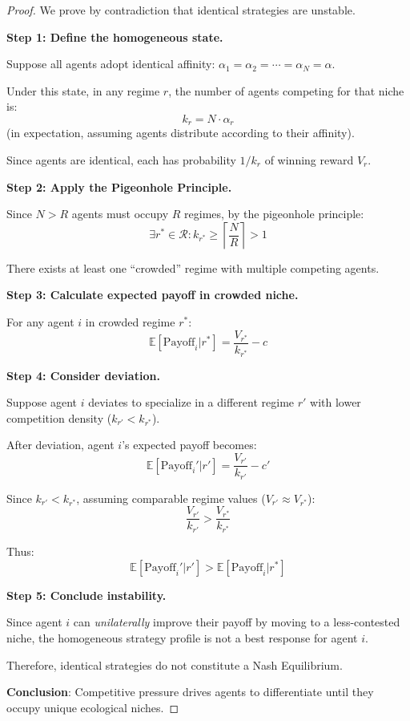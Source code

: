 \documentclass[11pt,a4paper]{article}
\theoremstyle{definition}
\theoremstyle{plain}
\newcommand{\E}{\mathbb{E}}
\begin{document}
\begin{proof}
We prove by contradiction that identical strategies are unstable.

\textbf{Step 1: Define the homogeneous state.}

Suppose all agents adopt identical affinity: $\alpha_1 = \alpha_2 = \cdots = \alpha_N = \alpha$.

Under this state, in any regime $r$, the number of agents competing for that niche is:
\begin{equation}
k_r = N \cdot \alpha_r
\end{equation}
(in expectation, assuming agents distribute according to their affinity).

Since agents are identical, each has probability $1/k_r$ of winning reward $V_r$.

\textbf{Step 2: Apply the Pigeonhole Principle.}

Since $N > R$ agents must occupy $R$ regimes, by the pigeonhole principle:
\begin{equation}
\exists r^* \in \mathcal{R} : k_{r^*} \geq \left\lceil \frac{N}{R} \right\rceil > 1
\end{equation}

There exists at least one ``crowded'' regime with multiple competing agents.

\textbf{Step 3: Calculate expected payoff in crowded niche.}

For any agent $i$ in crowded regime $r^*$:
\begin{equation}
\E[\text{Payoff}_i | r^*] = \frac{V_{r^*}}{k_{r^*}} - c
\end{equation}

\textbf{Step 4: Consider deviation.}

Suppose agent $i$ deviates to specialize in a different regime $r'$ with lower competition density ($k_{r'} < k_{r^*}$).

After deviation, agent $i$'s expected payoff becomes:
\begin{equation}
\E[\text{Payoff}_i' | r'] = \frac{V_{r'}}{k_{r'}} - c'
\end{equation}

Since $k_{r'} < k_{r^*}$, assuming comparable regime values ($V_{r'} \approx V_{r^*}$):
\begin{equation}
\frac{V_{r'}}{k_{r'}} > \frac{V_{r^*}}{k_{r^*}}
\end{equation}

Thus:
\begin{equation}
\E[\text{Payoff}_i' | r'] > \E[\text{Payoff}_i | r^*]
\end{equation}

\textbf{Step 5: Conclude instability.}

Since agent $i$ can \textit{unilaterally} improve their payoff by moving to a less-contested niche, the homogeneous strategy profile is not a best response for agent $i$.

Therefore, identical strategies do not constitute a Nash Equilibrium.

\textbf{Conclusion}: Competitive pressure drives agents to differentiate until they occupy unique ecological niches.
\end{proof}
\end{document}
